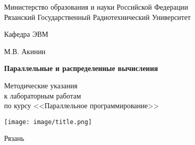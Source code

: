 
\begin{titlepage}

\begin{center}

Министерство образования и науки Российской Федерации \\
Рязанский Государственный Радиотехнический Университет

\bigskip

Кафедра ЭВМ

\vspace{5em}

М.В. Акинин

\vspace{3em}

{\Large \bf Параллельные и распределенные вычисления}

\vspace{3em}

Методические указания\\
к лабораторным работам\\
по курсу <<Параллельное программирование>>

\vfill

\texttt{[image: image/title.png]}

\vfill

Рязань \the\year

\end{center}

\thispagestyle{empty}

\end{titlepage}

\setcounter{page}{2}

\newpage

